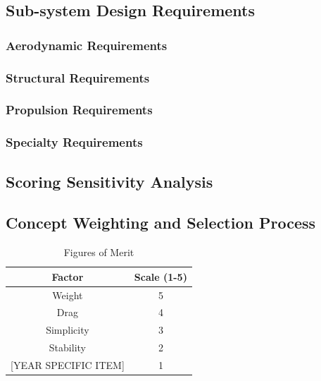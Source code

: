 \documentclass[report]{byu-aero}
\begin{document}
\subsection{Sub-system Design Requirements}
\label{ssec:systemreqs}

\subsubsection{Aerodynamic Requirements}
\label{sssec:aeroreqs}


\subsubsection{Structural Requirements}
\label{sssec:structreqs}


\subsubsection{Propulsion Requirements}
\label{sssec:propreqs}


\subsubsection{Specialty Requirements} %
\label{sssec:specialreqs}



\subsection{Scoring Sensitivity Analysis}
\label{ssec:scoringsensitivity}



\subsection{Concept Weighting and Selection Process}
\label{ssec:selectionprocess}


\begin{table}[h!]
	\centering
	\caption{Figures of Merit}
	\label{tab:fom}
	\begin{tabular}{ |c|c| } 
		\hline
		\rowcolor{BYUbluemid}
		Factor & Scale (1-5) \\ 
		\hline
		Weight & 5 \\ 
		\hline
		Drag & 4 \\ 
		\hline
		Simplicity & 3 \\ 
		\hline
		Stability & 2 \\ 
		\hline
		{\color{\BYUred} {\color{BYUred} [YEAR SPECIFIC ITEM]}} & 1 \\ 
		\hline
	\end{tabular}
\end{table}
\end{document}
